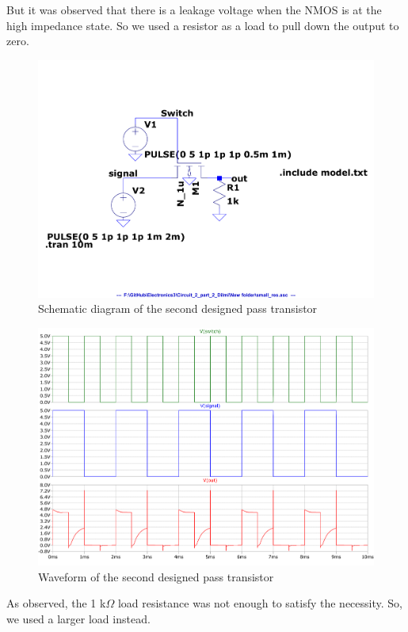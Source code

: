 \documentclass[a4paper,11pt]{article}%
\begin{document}
But it was observed that there is a leakage voltage when the NMOS is at the high impedance state. So we used a resistor as a load to pull down the output to zero.

\begin{figure}[H]
	\centering
	\includegraphics[scale=0.5]{figures/2part2/small_res_cct.pdf}
	\caption{Schematic diagram of the second designed pass transistor}
\end{figure}
\begin{figure}[H]
	\centering
	\includegraphics[scale=0.5]{figures/2part2/without_res_wave.pdf}
	\caption{Waveform of the second designed pass transistor}
\end{figure}

As observed, the 1 k$\Omega$ load resistance was not enough to satisfy the necessity. So, we used a larger load instead.
\end{document}
